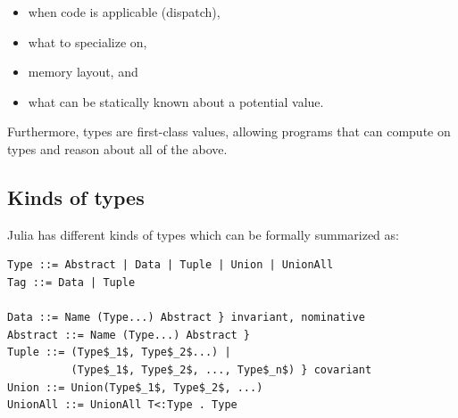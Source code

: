 \documentclass[pldi]{sigplanconf-pldi15}
\begin{document}
\begin{itemize}
\item when code is applicable (dispatch),
\item what to specialize on,
\item memory layout, and
\item what can be statically known about a potential value.
\end{itemize}
%
Furthermore, types are first-class values, allowing programs that can compute
on types and reason about all of the above.


\subsection{Kinds of types}

Julia has different kinds of types which can be formally summarized as:

\begin{lstlisting}
Type ::= Abstract | Data | Tuple | Union | UnionAll
Tag ::= Data | Tuple

Data ::= Name (Type...) Abstract } invariant, nominative
Abstract ::= Name (Type...) Abstract }
Tuple ::= (Type$_1$, Type$_2$...) |
          (Type$_1$, Type$_2$, ..., Type$_n$) } covariant
Union ::= Union(Type$_1$, Type$_2$, ...)
UnionAll ::= UnionAll T<:Type . Type
\end{lstlisting}
\end{document}
